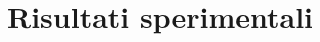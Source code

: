 \setlength{\parskip}{1em}
\setlength{\parindent}{0pt}
\chapter{Risultati sperimentali}
\label{chap:expdata}






